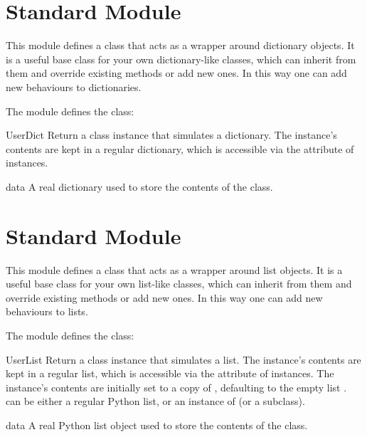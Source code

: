 \section{Standard Module }



This module defines a class that acts as a wrapper around
dictionary objects.  It is a useful base class for
your own dictionary-like classes, which can inherit from
them and override existing methods or add new ones.  In this way one
can add new behaviours to dictionaries.

The  module defines the  class:

\begin{classdesc}{UserDict}{}
Return a class instance that simulates a dictionary.  The instance's
contents are kept in a regular dictionary, which is accessible via the
 attribute of  instances.
\end{classdesc}

\begin{memberdesc}{data}
A real dictionary used to store the contents of the 
class.
\end{memberdesc}


\section{Standard Module }



This module defines a class that acts as a wrapper around
list objects.  It is a useful base class for
your own list-like classes, which can inherit from
them and override existing methods or add new ones.  In this way one
can add new behaviours to lists.

The  module defines the  class:

\begin{classdesc}{UserList}{}
Return a class instance that simulates a list.  The instance's
contents are kept in a regular list, which is accessible via the
 attribute of  instances.  The instance's
contents are initially set to a copy of , defaulting to the
empty list \code{[]}.   can be either a regular Python list,
or an instance of  (or a subclass).
\end{classdesc}

\begin{memberdesc}{data}
A real Python list object used to store the contents of the
 class.
\end{memberdesc}
